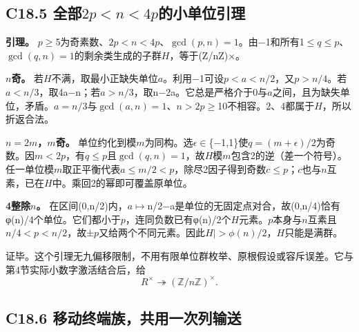 \subsection*{\texorpdfstring{{C18.5} {全部\ensuremath{2p<n<4p}的小单位引理}}{C18.5 全部的小单位引理}}\label{C18-h136}

\textbf{{引理。}} {\ensuremath{p}\ensuremath{\ge}5为奇素数、\ensuremath{2p<n<4p}、\ensuremath{\operatorname{gcd}(p,n)=1}。由−1和所有1\ensuremath{\le}\ensuremath{q}\ensuremath{\le}\ensuremath{p}、\ensuremath{\operatorname{gcd}(q,n)=1}的剩余类生成的子群\ensuremath{H}，等于(Z/nZ)×。}

\textbf{{\ensuremath{n}奇。}} {若\ensuremath{H}不满，取最小正缺失单位\ensuremath{a}。利用−1可设\ensuremath{p<a<n/2}，又\ensuremath{p>n/4}。若\ensuremath{a<n/3}，取4a−n；若\ensuremath{a>n/3}，取n−2a。它总是严格介于0与\ensuremath{a}之间，且为缺失单位，矛盾。\ensuremath{a=n/3}与\ensuremath{\operatorname{gcd}(a,n)=1}、\ensuremath{n>2p}\ensuremath{\ge}10不相容。2、4都属于\ensuremath{H}，所以折返合法。}

\textbf{{\ensuremath{n=2m}，\ensuremath{m}奇。}} {单位约化到模\ensuremath{m}为同构。选\ensuremath{\epsilon }\ensuremath{\in}\{−1,1\}使\ensuremath{q=(m+\epsilon )/2}为奇数。因\ensuremath{m<2p}，有\ensuremath{q}\ensuremath{\le}\ensuremath{p}且\ensuremath{\operatorname{gcd}(q,n)=1}，故\ensuremath{H}模\ensuremath{m}包含2的逆（差一个符号）。任一单位模\ensuremath{m}取正平衡代表\ensuremath{a}\ensuremath{\le}\ensuremath{m/2<p}，除尽2因子得到奇数\ensuremath{c}\ensuremath{\le}\ensuremath{p}；\ensuremath{c}也与\ensuremath{n}互素，已在\ensuremath{H}中。乘回2的幂即可覆盖原单位。}

\textbf{{4整除\ensuremath{n}。}} {在区间(0,n/2)内，\ensuremath{a}\ensuremath{\mapsto}n/2−a是单位的无固定点对合，故(0,n/4)恰有φ(n)/4个单位。它们都小于\ensuremath{p}，连同负数已有φ(n)/2个\ensuremath{H}元素。\ensuremath{p}本身与\ensuremath{n}互素且\ensuremath{n/4<p<n/2}，故±\ensuremath{p}又给两个不同元素。因此\textbar{}\ensuremath{H|>\phi (n)/2}，\ensuremath{H}只能是满群。}

{证毕。这个引理无九偏移限制，不用有限单位群枚举、原根假设或容斥误差。它与第4节实际小数字激活结合后，给} \[
\boxed{R^\times\twoheadrightarrow(\mathbb Z/n\mathbb Z)^\times.}
\tag{C18.5.1}
\]

\subsection*{\texorpdfstring{{C18.6} {移动终端族，共用一次列输送}}{C18.6 移动终端族，共用一次列输送}}\label{C18-h137}

